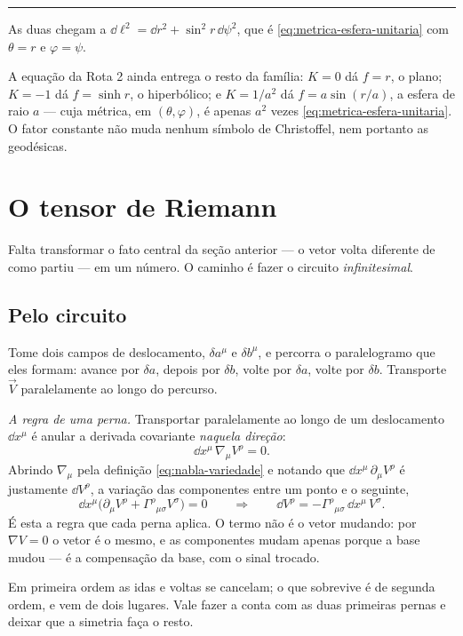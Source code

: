 \documentclass[12pt,a4paper,oneside]{book}
\theoremstyle{rgplain}
\theoremstyle{rgremark}
\begin{document}
\begin{infografico}[title={\sffamily\bfseries\footnotesize\color{rgPetroleo}A
MESMA MÉTRICA, SEM SAIR DA SUPERFÍCIE}]
\medskip
{\color{rgPetroClaro}\rule{\linewidth}{0.6pt}}
\medskip

\noindent
As duas chegam a $\dd\ell^2=\dd r^2+\sin^2r\,\dd\psi^2$, que é
\eqref{eq:metrica-esfera-unitaria} com $\theta=r$ e $\varphi=\psi$.

A equação da Rota 2 ainda entrega o resto da família: $K=0$ dá $f=r$, o
plano; $K=-1$ dá $f=\sinh r$, o hiperbólico; e $K=1/a^2$ dá
$f=a\sin(r/a)$, a esfera de raio $a$ --- cuja métrica, em
$(\theta,\varphi)$, é apenas $a^2$ vezes
\eqref{eq:metrica-esfera-unitaria}. O fator constante não muda nenhum
símbolo de Christoffel, nem portanto as geodésicas.
\end{infografico}

\section{O tensor de Riemann}
\label{sec:curvatura-riemann}

Falta transformar o fato central da seção anterior --- o vetor volta
diferente de como partiu --- em um número. O caminho é fazer o circuito
\emph{infinitesimal}.

\subsection*{Pelo circuito}

Tome dois campos de deslocamento, $\delta a^\mu$ e $\delta b^\mu$, e percorra
o paralelogramo que eles formam: avance por $\delta a$, depois por $\delta b$,
volte por $\delta a$, volte por $\delta b$. Transporte $\vec V$ paralelamente
ao longo do percurso.

\emph{A regra de uma perna.} Transportar paralelamente ao longo de um
deslocamento $\dd x^\mu$ é anular a derivada covariante \emph{naquela
direção}:
\[
  \dd x^\mu\,\nabla_\mu V^\rho=0 .
\]
Abrindo $\nabla_\mu$ pela definição \eqref{eq:nabla-variedade} e notando que
$\dd x^\mu\,\partial_\mu V^\rho$ é justamente $\dd V^\rho$, a variação das
componentes entre um ponto e o seguinte,
\[
  \dd x^\mu\bigl(\partial_\mu V^\rho
  +\Gamma^\rho{}_{\mu\sigma}V^\sigma\bigr)=0
  \qquad\Longrightarrow\qquad
  \dd V^\rho=-\Gamma^\rho{}_{\mu\sigma}\,\dd x^\mu\,V^\sigma .
\]
É esta a regra que cada perna aplica. O termo não é o vetor mudando: por
$\nabla V=0$ o vetor é o mesmo, e as componentes mudam apenas porque a base
mudou --- é a compensação da base, com o sinal trocado.

Em primeira ordem as idas e voltas se cancelam; o que sobrevive é de segunda
ordem, e vem de dois lugares. Vale fazer a conta com as duas primeiras pernas
e deixar que a simetria faça o resto.
\end{document}
